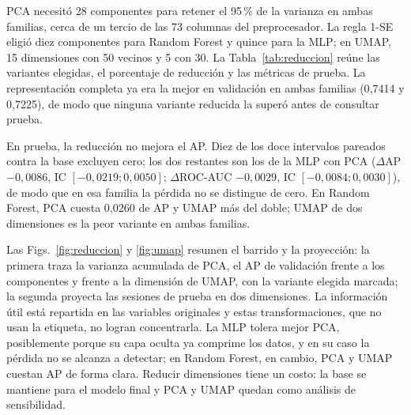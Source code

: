 \documentclass[journal]{IEEEtran}
\begin{document}
PCA necesitó 28 componentes para retener el 95\,\% de la varianza en ambas familias, cerca
de un tercio de las 73 columnas del preprocesador. La regla 1-SE eligió diez componentes para
Random Forest y quince para la MLP; en UMAP, 15 dimensiones con 50 vecinos y 5 con 30. La
Tabla~\ref{tab:reduccion} reúne las variantes elegidas, el porcentaje de reducción y las
métricas de prueba. La representación completa ya era la mejor en validación en ambas
familias (0{,}7414 y 0{,}7225), de modo que ninguna variante reducida la superó antes de
consultar prueba.

En prueba, la reducción no mejora el AP. Diez de los doce intervalos pareados contra la base
excluyen cero; los dos restantes son los de la MLP con PCA ($\Delta$AP $-0{,}0086$, IC
$[-0{,}0219;0{,}0050]$; $\Delta$ROC-AUC $-0{,}0029$, IC $[-0{,}0084;0{,}0030]$), de modo que
en esa familia la pérdida no se distingue de cero. En Random Forest, PCA cuesta 0{,}0260 de
AP y UMAP más del doble; UMAP de dos dimensiones es la peor variante en ambas familias.

Las Figs.~\ref{fig:reduccion} y \ref{fig:umap} resumen el barrido y la proyección: la
primera traza la varianza acumulada de PCA, el AP de validación frente a los componentes y
frente a la dimensión de UMAP, con la variante elegida marcada; la segunda proyecta las
sesiones de prueba en dos dimensiones. La información útil está repartida en las variables
originales y estas transformaciones, que no usan la etiqueta, no logran concentrarla. La MLP tolera mejor PCA,
posiblemente porque su capa oculta ya comprime los datos, y en su caso la pérdida no se alcanza a detectar; en
Random Forest, en cambio, PCA y UMAP cuestan AP de forma clara. Reducir dimensiones tiene
un costo: la base se mantiene para el modelo final y PCA y UMAP quedan como
análisis de sensibilidad.
\end{document}
